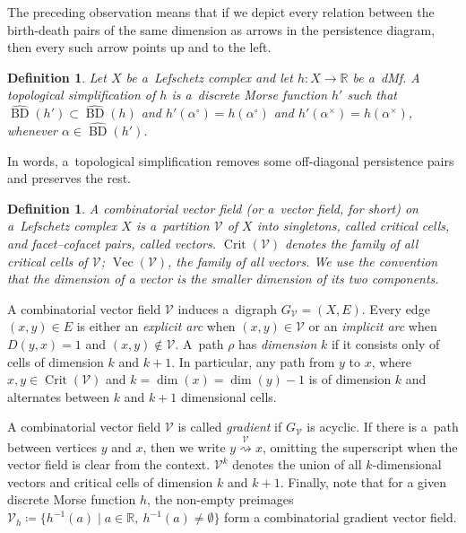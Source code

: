 \documentclass[a4paper,12pt, USenglish,cleveref,autoref,thm-restate]{article}
\newtheorem{definition}[theorem]{Definition}
\newcommand{\mf}{h}
\newcommand{\omf}{h'}
\DeclareMathOperator{\bd}{BD}
\newcommand{\upbd}{\hat{\bd}}
\newcommand{\hmB}{D}
\newcommand{\cx}{x}
\newcommand{\cy}{y}
\newcommand{\bth}[1]{#1^\circ}
\newcommand{\dth}[1]{#1^{\!\times}}
\newcommand{\RR}{\mathbb{R}}
\newcommand{\bds}{\alpha}
\newcommand{\cV}{\mathcal{V}}
\def\pathh#1{\overset{#1}{\rightsquigarrow}}
\DeclareMathOperator{\crit}{Crit}
\DeclareMathOperator{\vect}{Vec}
\def\pathh#1{\overset{#1}{\rightsquigarrow}}
\begin{document}
\noindent The preceding observation means that if we depict every relation between the birth-death pairs of the same dimension as arrows in the persistence diagram, then every such arrow points up and to the left.


\begin{definition}\label{def:topological_simplification}
Let $X$ be a~Lefschetz complex and let $\mf \colon X \to \RR$ be a~dMf.
A \emph{topological simplification of $\mf$} is a~discrete Morse function $\omf$ such that $\upbd(\omf) \subset \upbd(\mf)$ and $\omf(\bth\bds) = \mf(\bth\bds)$ and $\omf(\dth\bds) = \mf(\dth\bds)$, whenever $\bds \in \upbd(\omf)$.
\end{definition}

\noindent In words, a~topological simplification removes some off-diagonal persistence pairs and preserves the rest.

\begin{definition}
     A \emph{combinatorial vector field} (or a~vector field, for short) on a~Lefschetz complex $X$ is a~partition $\cV$ of $X$ into singletons, called \emph{critical cells}, and facet--cofacet pairs, called \emph{vectors}.
    $\crit(\cV)$ denotes the family of all critical cells of $\cV$; $\vect(\cV)$, the family of all vectors. We use the convention that the dimension of a vector is the smaller dimension of its two components.

\end{definition}
   
    
    \noindent A combinatorial vector field $\cV$ induces a~digraph $G_\cV=(X,E)$.
    Every edge $(\cx,\cy)\in E$ is either 
        an \emph{explicit arc} when $(\cx,\cy)\in\cV$ or
        an \emph{implicit arc} when $\hmB(\cy,\cx)=1$ and $(\cx,\cy)\not\in\cV$.
    A~path $\rho$ has \emph{dimension} $k$ if it consists only of cells of dimension $k$ and $k+1$.
    In particular, any path from $\cy$ to $\cx$, where $\cx,\cy\in\crit(\cV)$ and $k=\dim(\cx)=\dim(\cy)-1$ is of dimension $k$ and alternates between $k$ and $k+1$ dimensional cells.

    \noindent A combinatorial vector field $\cV$ is called \emph{gradient} if $G_\cV$ is acyclic. If there is a~path between vertices $\cy$ and $\cx$, then we  write $\cy \pathh{\cV} \cx$, omitting the superscript when the vector field is clear from the context. $\cV^{k}$ denotes the union of all $k$-dimensional vectors and critical cells of dimension $k$ and $k+1$. Finally, note that for a given discrete Morse function $\mf$, the non-empty preimages
$
\mathcal V_\mf \coloneqq \{\mf^{-1}(a) \mid a \in \mathbb{R},\ \mf^{-1}(a) \neq \emptyset\}
$
form a combinatorial gradient vector field.
\end{document}
